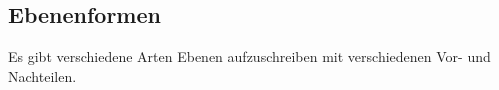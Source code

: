\subsection{Ebenenformen}
\label{sec:ebenen_formen}
Es gibt verschiedene Arten Ebenen aufzuschreiben mit verschiedenen Vor- und Nachteilen.




